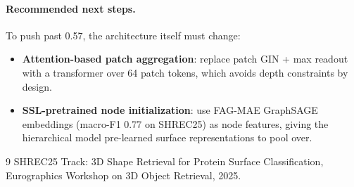 \documentclass[11pt,a4paper]{article}
\begin{document}
\paragraph{Recommended next steps.}
To push past 0.57, the architecture itself must change:
\begin{itemize}
  \item \textbf{Attention-based patch aggregation}: replace patch GIN + max
        readout with a transformer over 64 patch tokens, which avoids depth
        constraints by design.
  \item \textbf{SSL-pretrained node initialization}: use FAG-MAE GraphSAGE
        embeddings (macro-F1 0.77 on SHREC25) as node features, giving the
        hierarchical model pre-learned surface representations to pool over.
\end{itemize}

\begin{thebibliography}{9}
  SHREC25 Track: 3D Shape Retrieval for Protein Surface Classification,
  Eurographics Workshop on 3D Object Retrieval, 2025.
\end{thebibliography}
\end{document}
